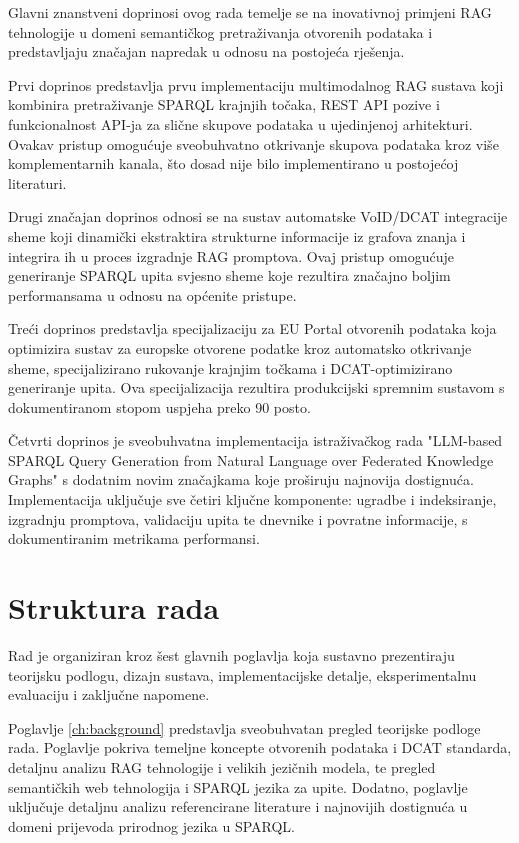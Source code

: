Glavni znanstveni doprinosi ovog rada temelje se na inovativnoj primjeni RAG tehnologije u domeni semantičkog pretraživanja otvorenih podataka i predstavljaju značajan napredak u odnosu na postojeća rješenja.

Prvi doprinos predstavlja prvu implementaciju multimodalnog RAG sustava koji kombinira pretraživanje SPARQL krajnjih točaka, REST API pozive i funkcionalnost API-ja za slične skupove podataka u ujedinjenoj arhitekturi. Ovakav pristup omogućuje sveobuhvatno otkrivanje skupova podataka kroz više komplementarnih kanala, što dosad nije bilo implementirano u postojećoj literaturi.

Drugi značajan doprinos odnosi se na sustav automatske VoID/DCAT integracije sheme koji dinamički ekstraktira strukturne informacije iz grafova znanja i integrira ih u proces izgradnje RAG promptova. Ovaj pristup omogućuje generiranje SPARQL upita svjesno sheme koje rezultira značajno boljim performansama u odnosu na općenite pristupe.

Treći doprinos predstavlja specijalizaciju za EU Portal otvorenih podataka koja optimizira sustav za europske otvorene podatke kroz automatsko otkrivanje sheme, specijalizirano rukovanje krajnjim točkama i DCAT-optimizirano generiranje upita. Ova specijalizacija rezultira produkcijski spremnim sustavom s dokumentiranom stopom uspjeha preko 90 posto.

Četvrti doprinos je sveobuhvatna implementacija istraživačkog rada "LLM-based SPARQL Query Generation from Natural Language over Federated Knowledge Graphs" \cite{emonet2024llm} s dodatnim novim značajkama koje proširuju najnovija dostignuća. Implementacija uključuje sve četiri ključne komponente: ugradbe i indeksiranje, izgradnju promptova, validaciju upita te dnevnike i povratne informacije, s dokumentiranim metrikama performansi.

\section{Struktura rada}
\label{sec:structure}

Rad je organiziran kroz šest glavnih poglavlja koja sustavno prezentiraju teorijsku podlogu, dizajn sustava, implementacijske detalje, eksperimentalnu evaluaciju i zaključne napomene.

Poglavlje \ref{ch:background} predstavlja sveobuhvatan pregled teorijske podloge rada. Poglavlje pokriva temeljne koncepte otvorenih podataka i DCAT standarda, detaljnu analizu RAG tehnologije i velikih jezičnih modela, te pregled semantičkih web tehnologija i SPARQL jezika za upite. Dodatno, poglavlje uključuje detaljnu analizu referencirane literature i najnovijih dostignuća u domeni prijevoda prirodnog jezika u SPARQL.

